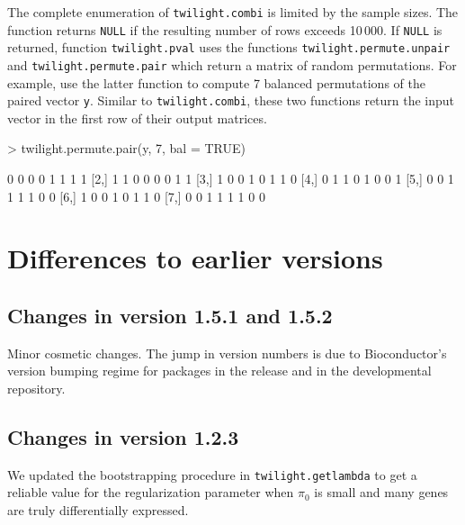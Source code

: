 \documentclass[11pt,a4paper,fleqn]{report}
\newcommand{\Rfunction}[1]{{\texttt{#1}}}
\newcommand{\Rfunarg}[1]{{\texttt{#1}}}
\begin{document}
The complete enumeration of \Rfunction{twilight.combi} is limited by the sample sizes. The function returns \Rfunarg{NULL} if the resulting number of rows exceeds 10\,000. If \Rfunarg{NULL} is returned, function \Rfunction{twilight.pval} uses the functions \Rfunction{twilight.permute.unpair} and \Rfunction{twilight.permute.pair} which return a matrix of random permutations. For example, use the latter function to compute 7 balanced permutations of the paired vector \Rfunarg{y}. Similar to \Rfunction{twilight.combi}, these two functions return the input vector in the first row of their output matrices.
\begin{Schunk}
\begin{Sinput}
> twilight.permute.pair(y, 7, bal = TRUE)
\end{Sinput}
\begin{Soutput}
     [,1] [,2] [,3] [,4] [,5] [,6] [,7] [,8]
[1,]    0    0    0    0    1    1    1    1
[2,]    1    1    0    0    0    0    1    1
[3,]    1    0    0    1    0    1    1    0
[4,]    0    1    1    0    1    0    0    1
[5,]    0    0    1    1    1    1    0    0
[6,]    1    0    0    1    0    1    1    0
[7,]    0    0    1    1    1    1    0    0
\end{Soutput}
\end{Schunk}




\chapter{Differences to earlier versions}

\section{Changes in version 1.5.1 and 1.5.2}

Minor cosmetic changes. The jump in version numbers is due to Bioconductor's version bumping regime for packages in the release and in the developmental repository.


\section{Changes in version 1.2.3}

We updated the bootstrapping procedure in \Rfunction{twilight.getlambda} to get a reliable value for the regularization parameter when $\pi_0$ is small and many genes are truly differentially expressed.
\end{document}
